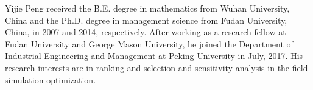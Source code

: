 \documentclass[journal]{IEEEtran}
\begin{document}
% 

\begin{IEEEbiographynophoto}{Yijie Peng} 
received the B.E. degree in mathematics from Wuhan University, China and the Ph.D. degree in management science from Fudan University, China, in 2007 and 2014, respectively.
After working as a research fellow at Fudan University and George Mason University, he joined the Department of Industrial Engineering and Management at Peking University in July, 2017.
His research interests are in ranking and selection and sensitivity analysis in the field simulation optimization.  

\end{IEEEbiographynophoto}
\end{document}
